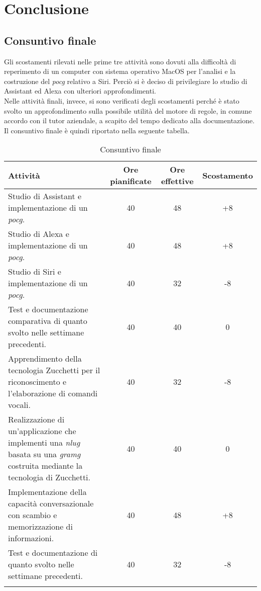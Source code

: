 
\chapter{Conclusione}
\label{cap:conclusione}


\section{Consuntivo finale}
Gli scostamenti rilevati nelle prime tre attività sono dovuti alla difficoltà di reperimento di un computer con sistema operativo MacOS per l'analisi e la costruzione del \emph{\gls{pocg}} relativo a Siri. Perciò si è deciso di privilegiare lo studio di Assistant ed Alexa con ulteriori approfondimenti. \\
Nelle attività finali, invece, si sono verificati degli scostamenti perché è stato svolto un approfondimento sulla possibile utilità del motore di regole, in comune accordo con il tutor aziendale, a scapito del tempo dedicato alla documentazione. \\
Il consuntivo finale è quindi riportato nella seguente tabella.
	\begin{longtable}{|p{4.5cm}|c|c|c|}
		\hline
		\textbf{Attività} & \textbf{Ore pianificate} & \textbf{Ore effettive} & \textbf{Scostamento} \\
		\hline
		Studio di Assistant e implementazione di un \emph{\gls{pocg}}. & 40 & 48 & +8 \\
		\hline
		Studio di Alexa e implementazione di un \emph{\gls{pocg}}. & 40 & 48 & +8 \\
		\hline
		Studio di Siri e implementazione di un \emph{\gls{pocg}}. & 40 & 32 & -8 \\
		\hline
		Test e documentazione comparativa di quanto svolto nelle settimane precedenti. & 40 & 40 & 0 \\
		\hline
		Apprendimento della tecnologia Zucchetti per il riconoscimento e l'elaborazione di comandi vocali. & 40 & 32 & -8 \\
		\hline
		Realizzazione di un'applicazione che implementi una \emph{\gls{nlug}} basata su una \emph{\gls{gramg}} costruita mediante la tecnologia di Zucchetti. & 40 & 40 & 0 \\
		\hline
		Implementazione della capacità conversazionale con scambio e memorizzazione di informazioni. & 40 & 48 & +8 \\
		\hline
		Test e documentazione di quanto svolto nelle settimane precedenti. & 40 & 32 & -8 \\	
		\hline
		\caption{Consuntivo finale}
	\end{longtable}
